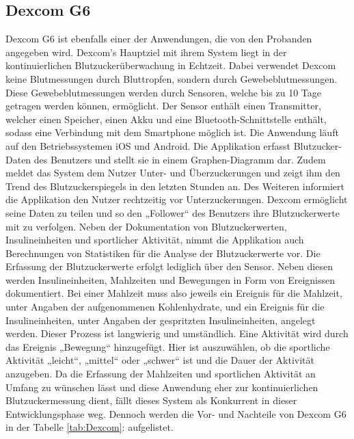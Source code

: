\documentclass[a4paper,11pt]{article}%
\renewcommand{\\}{\vspace*{0.5\baselineskip} \newline}
\begin{document}
	\subsection{Dexcom G6}
	Dexcom G6 ist ebenfalls einer der Anwendungen, die von den Probanden angegeben wird. Dexcom’s Hauptziel mit ihrem System liegt in der kontinuierlichen Blutzuckerüberwachung in Echtzeit. Dabei verwendet Dexcom keine Blutmessungen durch Bluttropfen, sondern durch Gewebeblutmessungen. Diese Gewebeblutmessungen werden durch Sensoren, welche bis zu 10 Tage getragen werden können, ermöglicht. Der Sensor enthält einen Transmitter, welcher einen Speicher, einen Akku und eine Bluetooth-Schnittstelle enthält, sodass eine Verbindung mit dem Smartphone möglich ist. Die Anwendung läuft auf den Betriebssystemen iOS und Android. Die Applikation erfasst Blutzucker-Daten des Benutzers und stellt sie in einem Graphen-Diagramm dar. Zudem meldet das System dem Nutzer Unter- und Überzuckerungen und zeigt ihm den Trend des Blutzuckerspiegels in den letzten Stunden an. Des Weiteren informiert die Applikation den Nutzer rechtzeitig vor Unterzuckerungen. Dexcom ermöglicht seine Daten zu teilen und so den „Follower“ des Benutzers ihre Blutzuckerwerte mit zu verfolgen. Neben der Dokumentation von Blutzuckerwerten, Insulineinheiten und sportlicher Aktivität, nimmt die Applikation auch Berechnungen von Statistiken für die Analyse der Blutzuckerwerte vor. Die Erfassung der Blutzuckerwerte erfolgt lediglich über den Sensor. Neben diesen werden Insulineinheiten, Mahlzeiten und Bewegungen in Form von Ereignissen dokumentiert. Bei einer Mahlzeit muss also jeweils ein Ereignis für die Mahlzeit, unter Angaben der aufgenommenen Kohlenhydrate, und ein Ereignis für die Insulineinheiten, unter Angaben der gespritzten Insulineinheiten, angelegt werden. Dieser Prozess ist langwierig und umständlich. Eine Aktivität wird durch das Ereignis „Bewegung“ hinzugefügt. Hier ist auszuwählen, ob die sportliche Aktivität „leicht“, „mittel“ oder „schwer“ ist und die Dauer der Aktivität anzugeben. Da die Erfassung der Mahlzeiten und sportlichen Aktivität an Umfang zu wünschen lässt und diese Anwendung eher zur kontinuierlichen Blutzuckermessung dient, fällt dieses System als Konkurrent in dieser Entwicklungsphase weg. Dennoch werden die Vor- und Nachteile von Dexcom G6 in der Tabelle \ref{tab:Dexcom}:  aufgelistet.\cite{D}
\end{document}
